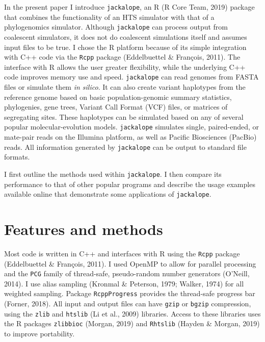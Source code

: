 \documentclass[12pt,]{article}
\begin{document}
In the present paper I introduce \texttt{jackalope}, an R (R Core Team, 2019) package
that combines the functionality of an HTS simulator with that of a
phylogenomics simulator.
Although \texttt{jackalope} can process output from coalescent simulators,
it does not do coalescent simulations itself and assumes input files to be true.
I chose the R platform because of its simple integration with C++ code via
the \texttt{Rcpp} package (Eddelbuettel \& François, 2011).
The interface with R allows the user greater flexibility, while the underlying
C++ code improves memory use and speed.
\texttt{jackalope} can read genomes from FASTA files or simulate them \emph{in silico}.
It can also create variant haplotypes from the reference genome based on basic
population-genomic summary statistics, phylogenies, gene trees,
Variant Call Format (VCF) files, or matrices of segregating sites.
These haplotypes can be simulated based on any of several popular
molecular-evolution models.
\texttt{jackalope} simulates single, paired-ended, or mate-pair reads on the Illumina platform,
as well as Pacific Biosciences (PacBio) reads.
All information generated by \texttt{jackalope} can be output to standard file formats.

I first outline the methods used within \texttt{jackalope}.
I then compare its performance to that of other popular programs
and describe the usage examples available online that demonstrate some applications
of \texttt{jackalope}.

\hypertarget{features-and-methods}{%
\section{Features and methods}\label{features-and-methods}}

Most code is written in C++ and interfaces with R using the \texttt{Rcpp} package
(Eddelbuettel \& François, 2011).
I used OpenMP to allow for parallel processing and
the \texttt{PCG} family of thread-safe, pseudo-random number generators
(O'Neill, 2014).
I use alias sampling (Kronmal \& Peterson, 1979; Walker, 1974) for all weighted sampling.
Package \texttt{RcppProgress} provides the thread-safe progress bar
(Forner, 2018).
All input and output files can have \texttt{gzip} or \texttt{bgzip} compression, using the
\texttt{zlib} and \texttt{htslib} (Li et al., 2009) libraries.
Access to these libraries uses the R packages
\texttt{zlibbioc} (Morgan, 2019) and \texttt{Rhtslib} (Hayden \& Morgan, 2019) to improve portability.
\end{document}
